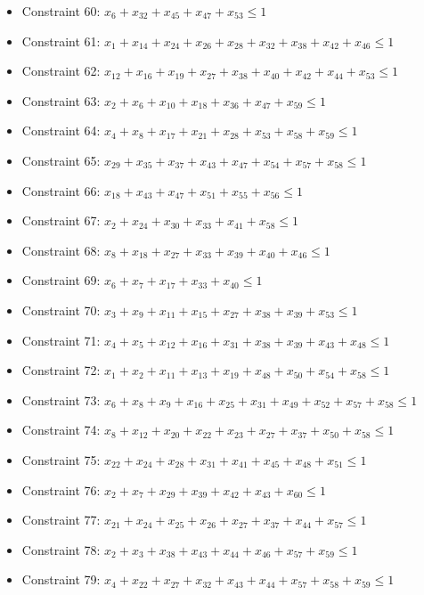 \documentclass[11pt]{article}
\begin{document}
\begin{itemize}
\item Constraint 60: $x_{6} + x_{32} + x_{45} + x_{47} + x_{53} \le 1$
\item Constraint 61: $x_{1} + x_{14} + x_{24} + x_{26} + x_{28} + x_{32} + x_{38} + x_{42} + x_{46} \le 1$
\item Constraint 62: $x_{12} + x_{16} + x_{19} + x_{27} + x_{38} + x_{40} + x_{42} + x_{44} + x_{53} \le 1$
\item Constraint 63: $x_{2} + x_{6} + x_{10} + x_{18} + x_{36} + x_{47} + x_{59} \le 1$
\item Constraint 64: $x_{4} + x_{8} + x_{17} + x_{21} + x_{28} + x_{53} + x_{58} + x_{59} \le 1$
\item Constraint 65: $x_{29} + x_{35} + x_{37} + x_{43} + x_{47} + x_{54} + x_{57} + x_{58} \le 1$
\item Constraint 66: $x_{18} + x_{43} + x_{47} + x_{51} + x_{55} + x_{56} \le 1$
\item Constraint 67: $x_{2} + x_{24} + x_{30} + x_{33} + x_{41} + x_{58} \le 1$
\item Constraint 68: $x_{8} + x_{18} + x_{27} + x_{33} + x_{39} + x_{40} + x_{46} \le 1$
\item Constraint 69: $x_{6} + x_{7} + x_{17} + x_{33} + x_{40} \le 1$
\item Constraint 70: $x_{3} + x_{9} + x_{11} + x_{15} + x_{27} + x_{38} + x_{39} + x_{53} \le 1$
\item Constraint 71: $x_{4} + x_{5} + x_{12} + x_{16} + x_{31} + x_{38} + x_{39} + x_{43} + x_{48} \le 1$
\item Constraint 72: $x_{1} + x_{2} + x_{11} + x_{13} + x_{19} + x_{48} + x_{50} + x_{54} + x_{58} \le 1$
\item Constraint 73: $x_{6} + x_{8} + x_{9} + x_{16} + x_{25} + x_{31} + x_{49} + x_{52} + x_{57} + x_{58} \le 1$
\item Constraint 74: $x_{8} + x_{12} + x_{20} + x_{22} + x_{23} + x_{27} + x_{37} + x_{50} + x_{58} \le 1$
\item Constraint 75: $x_{22} + x_{24} + x_{28} + x_{31} + x_{41} + x_{45} + x_{48} + x_{51} \le 1$
\item Constraint 76: $x_{2} + x_{7} + x_{29} + x_{39} + x_{42} + x_{43} + x_{60} \le 1$
\item Constraint 77: $x_{21} + x_{24} + x_{25} + x_{26} + x_{27} + x_{37} + x_{44} + x_{57} \le 1$
\item Constraint 78: $x_{2} + x_{3} + x_{38} + x_{43} + x_{44} + x_{46} + x_{57} + x_{59} \le 1$
\item Constraint 79: $x_{4} + x_{22} + x_{27} + x_{32} + x_{43} + x_{44} + x_{57} + x_{58} + x_{59} \le 1$

\end{itemize}
\end{document}
